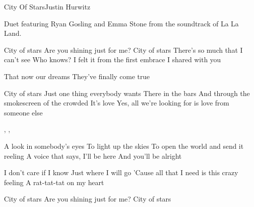 \documentclass[a4paper,11pt,french]{article}
\begin{document}

\begin{Song}{City Of Stars}{Justin Hurwitz}

\begin{Paratext}
Duet featuring Ryan Gosling and Emma Stone from the soundtrack of La La Land.
\end{Paratext}

\begin{multicols}{2}

\begin{Verse}
\begin{SingerMan}[Sebastian]
City of stars
Are you shining just for me?
City of stars
There's so much that I can't see
Who knows?
I felt it from the first embrace I shared with you
\end{SingerMan}
\begin{SingerWoman}[Mia]
That now our dreams
They've finally come true
\espaceInterStrophe

City of stars
Just one thing everybody wants
There in the bars
And through the smokescreen of the crowded 
It's love
Yes, all we're looking for is love from someone else
\end{SingerWoman}
\espaceInterStrophe

, 
, 
\vfill
\columnbreak

A look in somebody's eyes
To light up the skies
To open the world and send it reeling
A voice that says, I'll be here
And you'll be alright
\espaceInterStrophe

I don't care if I know
Just where I will go
'Cause all that I need is this crazy feeling
A rat-tat-tat on my heart
\espaceInterStrophe

\espaceInterStrophe

\begin{SingerMan}[Sebatian]
City of stars
Are you shining just for me?
City of stars
\end{SingerMan}
\end{Verse}

\vfill
~
\end{multicols}

\vfill

\begin{multicols}{2}


\end{multicols}
\end{Song}
\end{document}
